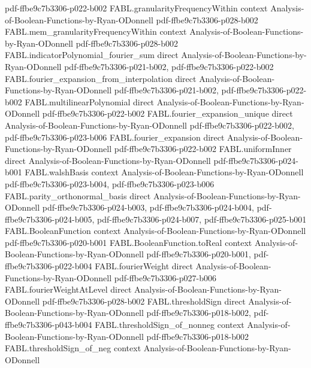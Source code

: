 \begin{theorem}
  {pdf-ffbe9c7b3306-p022-b002}
\proofstep
  {FABL.granularityFrequencyWithin}
  {context}
  {Analysis-of-Boolean-Functions-by-Ryan-ODonnell}
  {pdf-ffbe9c7b3306-p028-b002}
\proofstep
  {FABL.mem_granularityFrequencyWithin}
  {context}
  {Analysis-of-Boolean-Functions-by-Ryan-ODonnell}
  {pdf-ffbe9c7b3306-p028-b002}
\proofstep
  {FABL.indicatorPolynomial_fourier_sum}
  {direct}
  {Analysis-of-Boolean-Functions-by-Ryan-ODonnell}
  {pdf-ffbe9c7b3306-p021-b002,
    pdf-ffbe9c7b3306-p022-b002}
\proofstep
  {FABL.fourier_expansion_from_interpolation}
  {direct}
  {Analysis-of-Boolean-Functions-by-Ryan-ODonnell}
  {pdf-ffbe9c7b3306-p021-b002,
    pdf-ffbe9c7b3306-p022-b002}
\proofstep
  {FABL.multilinearPolynomial}
  {direct}
  {Analysis-of-Boolean-Functions-by-Ryan-ODonnell}
  {pdf-ffbe9c7b3306-p022-b002}
\proofstep
  {FABL.fourier_expansion_unique}
  {direct}
  {Analysis-of-Boolean-Functions-by-Ryan-ODonnell}
  {pdf-ffbe9c7b3306-p022-b002,
    pdf-ffbe9c7b3306-p023-b006}
\proofstep
  {FABL.fourier_expansion}
  {direct}
  {Analysis-of-Boolean-Functions-by-Ryan-ODonnell}
  {pdf-ffbe9c7b3306-p022-b002}
\proofstep
  {FABL.uniformInner}
  {direct}
  {Analysis-of-Boolean-Functions-by-Ryan-ODonnell}
  {pdf-ffbe9c7b3306-p024-b001}
\proofstep
  {FABL.walshBasis}
  {context}
  {Analysis-of-Boolean-Functions-by-Ryan-ODonnell}
  {pdf-ffbe9c7b3306-p023-b004,
    pdf-ffbe9c7b3306-p023-b006}
\proofstep
  {FABL.parity_orthonormal_basis}
  {direct}
  {Analysis-of-Boolean-Functions-by-Ryan-ODonnell}
  {pdf-ffbe9c7b3306-p024-b003,
    pdf-ffbe9c7b3306-p024-b004,
    pdf-ffbe9c7b3306-p024-b005,
    pdf-ffbe9c7b3306-p024-b007,
    pdf-ffbe9c7b3306-p025-b001}
\proofstep
  {FABL.BooleanFunction}
  {context}
  {Analysis-of-Boolean-Functions-by-Ryan-ODonnell}
  {pdf-ffbe9c7b3306-p020-b001}
\proofstep
  {FABL.BooleanFunction.toReal}
  {context}
  {Analysis-of-Boolean-Functions-by-Ryan-ODonnell}
  {pdf-ffbe9c7b3306-p020-b001,
    pdf-ffbe9c7b3306-p022-b004}
\proofstep
  {FABL.fourierWeight}
  {direct}
  {Analysis-of-Boolean-Functions-by-Ryan-ODonnell}
  {pdf-ffbe9c7b3306-p027-b006}
\proofstep
  {FABL.fourierWeightAtLevel}
  {direct}
  {Analysis-of-Boolean-Functions-by-Ryan-ODonnell}
  {pdf-ffbe9c7b3306-p028-b002}
\proofstep
  {FABL.thresholdSign}
  {direct}
  {Analysis-of-Boolean-Functions-by-Ryan-ODonnell}
  {pdf-ffbe9c7b3306-p018-b002,
    pdf-ffbe9c7b3306-p043-b004}
\proofstep
  {FABL.thresholdSign_of_nonneg}
  {context}
  {Analysis-of-Boolean-Functions-by-Ryan-ODonnell}
  {pdf-ffbe9c7b3306-p018-b002}
\proofstep
  {FABL.thresholdSign_of_neg}
  {context}
  {Analysis-of-Boolean-Functions-by-Ryan-ODonnell}

\end{theorem}
